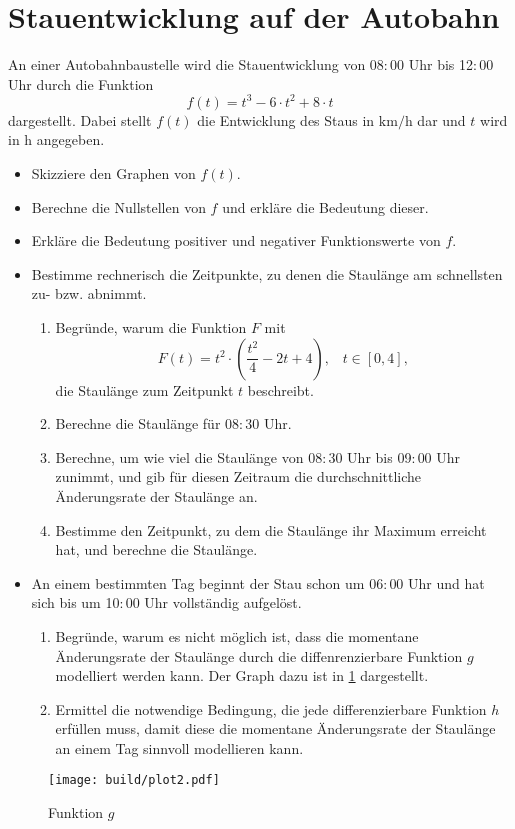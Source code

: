 



\section*{Stauentwicklung auf der Autobahn}

An einer Autobahnbaustelle wird die Stauentwicklung von 08$:$00 Uhr bis 12$:$00 Uhr durch die Funktion
\begin{equation*}
    f(t) = t^3-6\cdot t^2+8\cdot t
\end{equation*}
dargestellt.
Dabei stellt $f(t)$ die Entwicklung des Staus in $\si{\kilo\meter\per\hour}$ dar und $t$ wird in $\si{\hour}$ angegeben.

\begin{itemize}
    \item Skizziere den Graphen von $f(t)$.
    \item Berechne die Nullstellen von $f$ und erkläre die Bedeutung dieser.
    \item Erkläre die Bedeutung positiver und negativer Funktionswerte von $f$.
    \item Bestimme rechnerisch die Zeitpunkte, zu denen die Staulänge am schnellsten zu- bzw. abnimmt.
        \begin{enumerate}
            \item Begründe, warum die Funktion $F$ mit
            \begin{equation}
                  F(t) = t^2\cdot\left(\frac{t^2}{4}-2t+4\right), \;\;\; t \in \left[0,4\right],
            \end{equation}
            die Staulänge zum Zeitpunkt $t$ beschreibt.
            \item Berechne die Staulänge für 08$:$30 Uhr.
            \item Berechne, um wie viel die Staulänge von 08$:$30 Uhr bis 09$:$00 Uhr zunimmt, und gib für diesen Zeitraum die durchschnittliche Änderungsrate der Staulänge an.
            \item Bestimme den Zeitpunkt, zu dem die Staulänge ihr Maximum erreicht hat, und berechne die Staulänge.
        \end{enumerate}
    \item An einem bestimmten Tag beginnt der Stau schon um 06$:$00 Uhr und hat sich bis um 10$:$00 Uhr vollständig aufgelöst.
        \begin{enumerate}
            \item Begründe, warum es nicht möglich ist, dass die momentane Änderungsrate der Staulänge durch die diffenrenzierbare Funktion $g$ modelliert werden kann.
                Der Graph dazu ist in \ref{fig:g} dargestellt.
            \item Ermittel die notwendige Bedingung, die jede differenzierbare Funktion $h$ erfüllen muss, damit diese die momentane Änderungsrate der Staulänge an einem Tag sinnvoll modellieren kann.
        \end{enumerate}
\end{itemize}
\begin{figure}
    \centering
    \texttt{[image: build/plot2.pdf]}
    \caption{Funktion $g$}
    \label{fig:g}
\end{figure}


